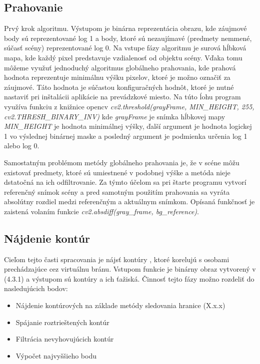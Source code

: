 \subsection{Prahovanie}
Prvý krok algoritmu. Výstupom je binárna reprezentácia obrazu, kde záujmové body sú reprezentované log 1 a body, ktoré sú nezaujímavé (predmety nemmené, súčasť scény) reprezentované log 0. Na vstupe fázy algoritmu je surová hĺbková mapa, kde každý pixel predstavuje vzdialenosť od objektu scény. Vďaka tomu môžeme využuť jednoduchý algoritmus globálneho prahovania, kde prahová hodnota reprezentuje minimálnu výšku pixelov, ktoré je možno označiť za záujmové. Táto hodnota je súčastou konfiguračných hodnôt, ktoré je nutné nastaviť pri inštalácii aplikácie na prevádzkové miesto. Na túto ĺohu program využíva funkciu z knižnice opencv \textit{cv2.threshold(grayFrame, MIN\_HEIGHT, 255, cv2.THRESH\_BINARY\_INV)} kde \textit{grayFrame} je snímka hĺbkovej mapy \textit{MIN\_HEIGHT} je hodnota minimálnej výšky, ďalší argument je hodnota logickej 1 vo výslednej binárnej maske a posledný argument je podmienka určenia log 1 alebo log 0.

Samostatným problémom metódy globálneho prahovania je, že v scéne môžu existovať predmety, ktoré sú umiestnené v podobnej výške a metóda nieje dstatočná na ich  odfiltrovanie. Za týmto účelom sa pri štarte programu vytvorí referenčný snímok scény a pred samotným použitím prahovania sa vyráta absolútny rozdiel medzi referenčným a aktuálnym snímkom. Opísaná funkčnosť je zaistená volaním funkcie \textit{cv2.absdiff(gray\_frame, bg\_reference)}.


\subsection{Nájdenie kontúr}
Cieľom tejto časti spracovania je nájsť kontúry , ktoré korelujú s osobami prechádzajúce cez virtuálnu bránu. Vstupom funkcie je binárny obraz vytvorený v (4.3.1) a výstupom sú kontúry a ich  ťažiská. Činnosť tejto fázy možno rozdeliť do nasledujúcich bodov:  
\begin{itemize}
\item Nájdenie kontúrových na základe metódy sledovania hranice (X.x.x)
\item Spájanie roztrieštených kontúr
\item Filtrácia nevyhovujúcich kontúr
\item Výpočet najvyššieho bodu 
\end{itemize}
\vspace{5mm}

